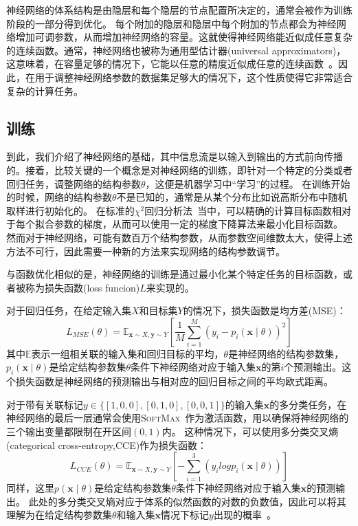 神经网络的体系结构是由隐层和每个隐层的节点配置所决定的，通常会被作为训练阶段的一部分得到优化。
每个附加的隐层和隐层中每个附加的节点都会为神经网络增加可调参数，从而增加神经网络的容量。这就使得神经网络能近似成任意复杂的连续函数。通常，神经网络也被称为通用型估计器(universal approximators)，这意味着，在容量足够的情况下，它能以任意的精度近似成任意的连续函数~\cite{MLSV}。因此，在用于调整神经网络参数的数据集足够大的情况下，这个性质使得它非常适合复杂的计算任务。


\subsection{训练}
\label{sec:Train}

到此，我们介绍了神经网络的基础，其中信息流是以输入到输出的方式前向传播的。接着，比较关键的一个概念是对神经网络的训练，即针对一个特定的分类或者回归任务，调整网络的结构参数$\theta$，这便是机器学习中“学习”的过程。
在训练开始的时候，网络的结构参数$\theta$不是已知的，通常是从某个分布比如说高斯分布中随机取样进行初始化的。
在标准的$\chi^2$回归分析法~\cite{WENDT1991275}当中，可以精确的计算目标函数相对于每个拟合参数的梯度，从而可以使用一定的梯度下降算法来最小化目标函数。
然而对于神经网络，可能有数百万个结构参数，从而参数空间维数太大，使得上述方法不可行，因此需要一种新的方法来实现网络的结构参数调节。

与函数优化相似的是，神经网络的训练是通过最小化某个特定任务的目标函数，或者被称为损失函数(loss funcion)$L$来实现的。

对于回归任务，在给定输入集$X$和目标集$Y$的情况下，损失函数是均方差(MSE)：
\begin{equation} 
\label{eq:ml2}	
L_{MSE}(\theta) = \mathbb{E}_{\boldsymbol{x} \sim X, \boldsymbol{y} \sim Y} \left[ \frac{1}{M} \sum_{i=1}^M (y_i - p_i (\boldsymbol{x} \mid \theta))^2 \right]
\end{equation}
其中$\mathbb{E}$表示一组相关联的输入集和回归目标的平均，$\theta$是神经网络的结构参数集，$p_i (\boldsymbol{x} \mid \theta)$是给定结构参数集$\theta$条件下神经网络对应于输入集$\boldsymbol{x}$的第$i$个预测输出。这个损失函数是神经网络的预测输出与相对应的回归目标之间的平均欧式距离。

对于带有关联标记$y\in\{[1,0,0],[0,1,0],[0,0,1]\}$的输入集$\boldsymbol{x}$的多分类任务，在神经网络的最后一层通常会使用\textsc{SoftMax}~\cite{MLMIT}作为激活函数，用以确保将神经网络的三个输出变量都限制在开区间$(0,1)$内。
这种情况下，可以使用多分类交叉熵(categorical cross-entropy,CCE)作为损失函数：
\begin{equation} 
\label{eq:ml3}	
L_{CCE}(\theta) = \mathbb{E}_{\boldsymbol{x} \sim X, \boldsymbol{y} \sim Y} \left[ - \sum_{i=1}^3 (y_i log p_i (\boldsymbol{x} \mid \theta)) \right]
\end{equation}
同样，这里$p(\boldsymbol{x} \mid \theta)$是给定结构参数集$\theta$条件下神经网络对应于输入集$\boldsymbol{x}$的预测输出。
此处的多分类交叉熵对应于体系的似然函数的对数的负数值，因此可以将其理解为在给定结构参数集$\theta$和输入集$\boldsymbol{x}$情况下标记$y$出现的概率~\cite{MLSV}。


